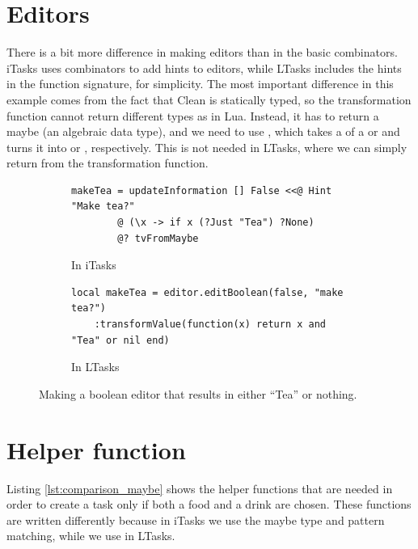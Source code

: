 \section{Editors}
There is a bit more difference in making editors than in the basic combinators. iTasks uses combinators to add hints to editors, while LTasks includes the hints in the function signature, for simplicity. The most important difference in this example comes from the fact that Clean is statically typed, so the transformation function cannot return different types as in Lua. Instead, it has to return a maybe (an algebraic data type), and we need to use , which takes a  of a  or  and turns it into  or , respectively. This is not needed in LTasks, where we can simply return  from the transformation function.

\begin{figure}[ht]
\begin{subfigure}{\textwidth}
\centering
\begin{verbatim}
makeTea = updateInformation [] False <<@ Hint "Make tea?"
        @ (\x -> if x (?Just "Tea") ?None)
        @? tvFromMaybe
\end{verbatim}
\caption{In iTasks}
\label{lst:comparison_editors_clean}
\end{subfigure}
\begin{subfigure}{\textwidth}
\centering
\bigskip %
\begin{verbatim}
local makeTea = editor.editBoolean(false, "make tea?")
    :transformValue(function(x) return x and "Tea" or nil end)
\end{verbatim}
\caption{In LTasks}
\label{lst:comparison_editors_lua}
\end{subfigure}
\caption{Making a boolean editor that results in either ``Tea'' or nothing.}
\label{lst:comparison_editors}
\end{figure}

\section{Helper function}
Listing \ref{lst:comparison_maybe} shows the helper functions that are needed in order to create a  task only if both a food and a drink are chosen.
These functions are written differently because in iTasks we use the maybe type and pattern matching, while we use  in LTasks.

